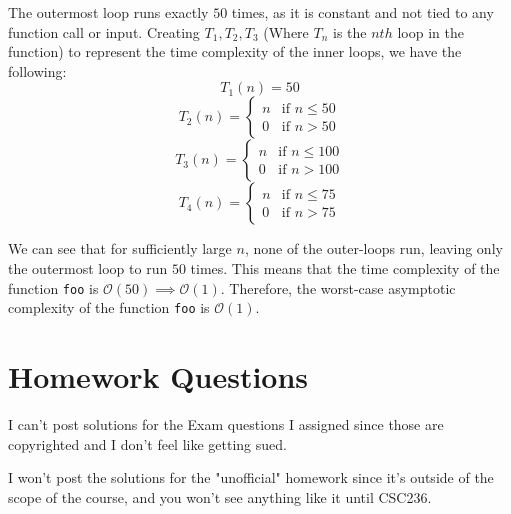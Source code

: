 \documentclass[12pt]{article}
\begin{document}
The outermost loop runs exactly $50$ times, as it is constant and not tied to any function call or input. Creating $T_1, T_2, T_3$ (Where $T_n$ is the $nth$ loop in the function) to represent the time complexity of the inner loops, we have the following:
\begin{equation*}
    T_1(n) = 50
\end{equation*}
\begin{equation*}
    T_2(n) = \begin{cases}
        n & \text{if } n \leq 50 \\
        0 & \text{if } n > 50
    \end{cases}
\end{equation*}
\begin{equation*}
    T_3(n) = \begin{cases}
        n & \text{if } n \leq 100 \\
        0 & \text{if } n > 100
    \end{cases}
\end{equation*}
\begin{equation*}
    T_4(n) = \begin{cases}
        n & \text{if } n \leq 75 \\
        0 & \text{if } n > 75
    \end{cases}
\end{equation*}

We can see that for sufficiently large $n$, none of the outer-loops run, leaving only the outermost loop to run $50$ times. This means that the time complexity of the function \texttt{foo} is $\mathcal{O}(50) \implies \mathcal{O}(1)$. Therefore, the worst-case asymptotic complexity of the function \texttt{foo} is $\mathcal{O}(1)$.

\section*{Homework Questions}

I can't post solutions for the Exam questions I assigned since those are copyrighted and I don't feel like getting sued.

I won't post the solutions for the "unofficial" homework since it's outside of the scope of the course, and you won't see anything like it until CSC236.
\end{document}
